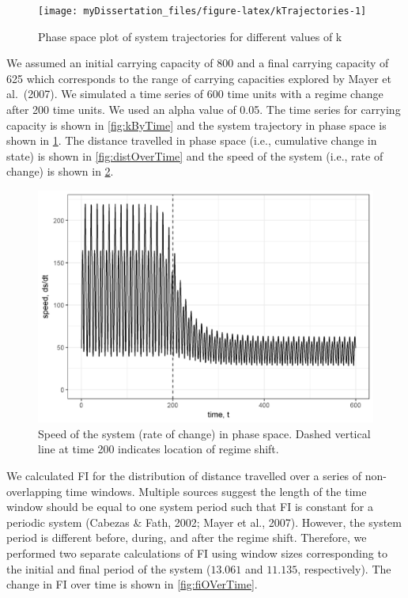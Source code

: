 \documentclass[12pt,twoside]{reedthesis}
\begin{document}
\begin{figure}

{\centering \texttt{[image: myDissertation\_files/figure-latex/kTrajectories-1]} 

}

\caption{Phase space plot of system trajectories for different values of k}\label{fig:kTrajectories}
\end{figure}
We assumed an initial carrying capacity of 800 and a final carrying capacity of 625 which corresponds to the range of carrying capacities explored by Mayer et al.~(2007). We simulated a time series of 600 time units with a regime change after 200 time units. We used an alpha value of 0.05. The time series for carrying capacity is shown in \ref{fig:kByTime} and the system trajectory in phase space is shown in \ref{fig:kTrajectories}. The distance travelled in phase space (i.e., cumulative change in state) is shown in \ref{fig:distOverTime} and the speed of the system (i.e., rate of change) is shown in \ref{fig:dsdtOverTime}.
\begin{figure}

{\centering \includegraphics[width=0.75\linewidth]{./chapterFiles/fiGuide/figures/dsdtOverTime} 

}

\caption{Speed of the system (rate of change) in phase space. Dashed vertical line at time 200 indicates location of regime shift.}\label{fig:dsdtOverTime}
\end{figure}
We calculated FI for the distribution of distance travelled over a series of non-overlapping time windows. Multiple sources suggest the length of the time window should be equal to one system period such that FI is constant for a periodic system (Cabezas \& Fath, 2002; Mayer et al., 2007). However, the system period is different before, during, and after the regime shift. Therefore, we performed two separate calculations of FI using window sizes corresponding to the initial and final period of the system (\(13.061\) and \(11.135\), respectively). The change in FI over time is shown in \ref{fig:fiOVerTime}.
\end{document}
